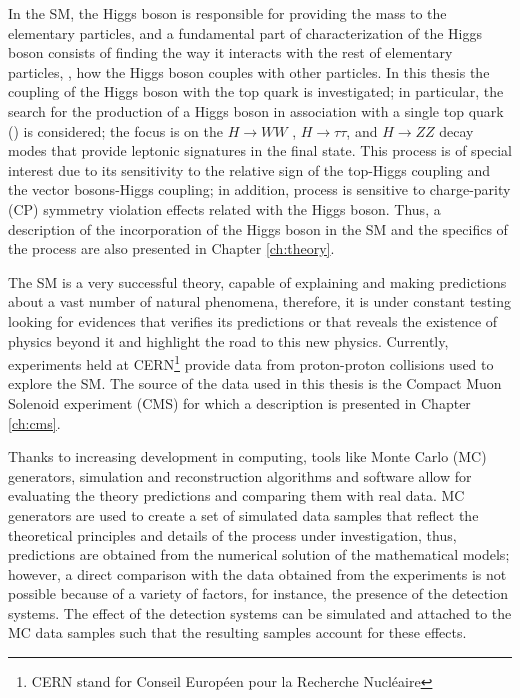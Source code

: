 In the SM, the Higgs boson is responsible for providing the mass to the elementary particles, and a fundamental part of characterization of the Higgs boson consists of finding the way it interacts with the rest of elementary particles, \ie, how the Higgs boson couples with other particles. In this thesis the coupling of the Higgs boson with the top quark is investigated; in particular, the search for the production of a Higgs boson in association with a single top quark (\tH) is considered; the focus is on the $H \to WW$ , $H \to \tau\tau$, and $H \to ZZ$ decay modes that provide leptonic signatures in the final state. This process is of special interest due to its sensitivity to the relative sign of the top-Higgs coupling and the vector bosons-Higgs coupling; in addition, \tH process is sensitive to charge-parity (CP) symmetry violation effects related with the Higgs boson. Thus, a description of the incorporation of the Higgs boson in the SM and the specifics of the \tH process are also presented in Chapter \ref{ch:theory}.               

The SM is a very successful theory, capable of explaining and making predictions about a vast number of natural phenomena, therefore, it is under constant testing looking for evidences that verifies its predictions or that reveals the existence of physics beyond it and highlight the road to this new physics. Currently, experiments held at CERN\footnote{CERN stand for Conseil Europ\'een pour la Recherche Nucl\'eaire} provide data from proton-proton collisions used to explore the SM. The source of the data used in this thesis is the Compact Muon Solenoid experiment (CMS) for which a description is presented in Chapter \ref{ch:cms}.

Thanks to increasing development in computing, tools like Monte Carlo (MC) generators, simulation and reconstruction algorithms and software allow for evaluating the theory predictions and comparing them with real data. MC generators are used to create a set of simulated data samples that reflect the theoretical principles and details of the process under investigation, thus, predictions are obtained from the numerical solution of the mathematical models; however, a direct comparison with the data obtained from the experiments is not possible because of a variety of factors, for instance, the presence of the detection systems. The effect of the detection systems can be simulated and attached to the MC data samples such that the resulting samples account for these effects.


